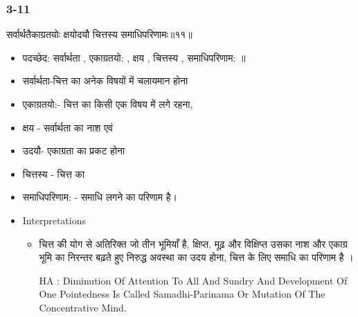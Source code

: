 \begin{frame}[fragile]\frametitle{3-11}
\begin{sanskrit}
सर्वार्थतैकाग्रतयोः क्षयोदयौ चित्तस्य समाधिपरिणामः॥११॥
\end{sanskrit}

	\begin{itemize}
	\item पदच्छेद:  सर्वार्थता , एकाग्रतयो: , क्षय‌ , चित्तस्य , समाधिपरिणाम: ॥
	\item सर्वार्थता-चित्त का अनेक विषयों में चलायमान होना
	\item एकाग्रतयो:- चित्त का किसी एक विषय में लगे रहना,
	\item क्षय - सर्वार्थता का नाश एवं
	\item उदयौ- एकाग्रता का प्रकट होना
	\item चित्तस्य - चित्त का
	\item समाधिपरिणाम: - समाधि लगने का परिणाम है।	
	\item Interpretations
		\begin{itemize}	
		\item चित्त की योग से अतिरिक्त जो तीन भूमियाँ है, क्षिप्त, मूढ़ और विक्षिप्त उसका नाश और एकाग्र भूमि का निरन्तर बढ़ते हुए निरुद्ध अवस्था का उदय होना, चित्त के लिए समाधि का परिणाम है ।
		\item [HA]: Diminution Of Attention To All And Sundry And Development Of One Pointedness Is Called Samadhi-Parinama Or Mutation Of The Concentrative Mind.
		\end{itemize}
	\end{itemize}
\end{frame}


